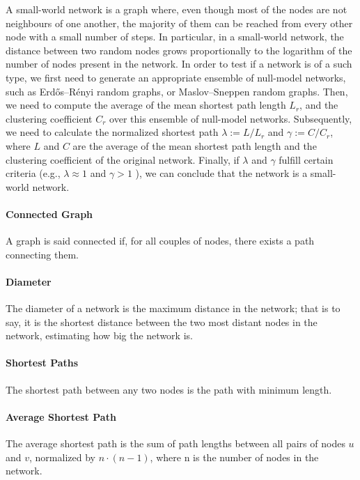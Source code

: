 \documentclass[10pt,twocolumn,letterpaper]{article}
\begin{document}
A small-world network is a graph where, even though most of the nodes are not neighbours of one another, the majority of them can be reached from every other node with a small number of steps. In particular, in a small-world network, the distance between two random nodes grows proportionally to the logarithm of the number of nodes present in the network. 
In order to test if a network is of a such type, we first need to generate an appropriate ensemble of null-model networks, such as Erdős–Rényi random graphs, or Maslov–Sneppen random graphs. Then, we need to compute the average of the mean shortest path length $L_r$, and the clustering coefficient $C_r$ over this ensemble of null-model networks. Subsequently, we need to calculate the normalized shortest path $\lambda:=L / L_{r}$ and $\gamma:=C / C_{r}$, where $L$ and $C$ are the average of the mean shortest path length and the clustering coefficient of the original network. Finally, if $\lambda$ and $\gamma$ fulfill certain criteria (e.g., $\lambda \approx 1$ and $\gamma>1$ ), we can conclude that the network is a small-world network.

\paragraph{Connected Graph}

A graph is said connected if, for all couples of nodes, there exists a path connecting them.

\paragraph{Diameter}

The diameter of a network is the maximum distance in the network; that is to say, it is the shortest distance between the two most distant nodes in the network, estimating how big the network is.

\paragraph{Shortest Paths}

The shortest path between any two nodes is the path with minimum length.

\paragraph{Average Shortest Path}

The average shortest path is the sum of path lengths between all pairs of nodes $u$ and $v$, normalized by $n\cdot(n-1)$, where n is the number of nodes in the network.
\end{document}
